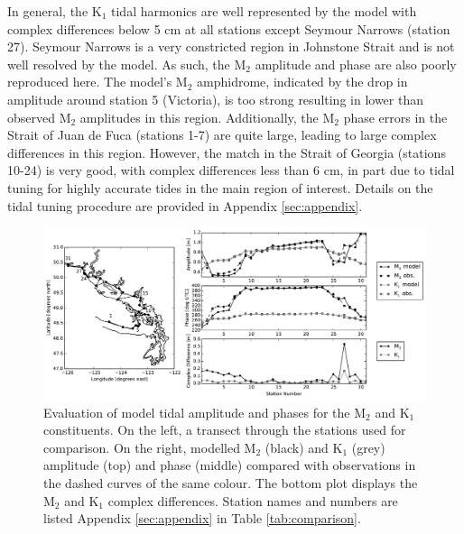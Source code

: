 \documentclass[pdftex,10pt]{article}
\begin{document}
In general, the K$_1$ tidal harmonics are well represented by the model with complex differences below 5 cm at all stations except Seymour Narrows (station 27). Seymour Narrows is a very constricted region in Johnstone Strait and is not well resolved by the model. As such, the M$_2$ amplitude and phase are also poorly reproduced here. The model's M$_2$ amphidrome, indicated by the drop in amplitude around station 5 (Victoria), is too strong resulting in lower than observed M$_2$ amplitudes in this region. Additionally, the M$_2$ phase errors in the Strait of Juan de Fuca (stations 1-7) are quite large, leading to large complex differences in this region.  However, the match in the Strait of Georgia (stations 10-24) is very good, with complex differences less than 6 cm, in part due to tidal tuning for highly accurate tides in the main region of interest. Details on the tidal tuning procedure are provided in Appendix \ref{sec:appendix}.


\begin{figure}
\centering
\includegraphics[scale=0.6]{Figures/tides.pdf}
\caption{Evaluation of model tidal amplitude and phases for the M$_2$ and K$_1$ constituents. On the left, a transect through the stations used for comparison. On the right, modelled M$_2$ (black) and K$_1$ (grey) amplitude (top) and phase (middle) compared with observations in the dashed curves of the same colour. The bottom plot displays the M$_2$ and K$_1$ complex differences. Station names and numbers are listed Appendix \ref{sec:appendix} in Table \ref{tab:comparison}.}
\label{fig:tides}
\end{figure}
\end{document}
